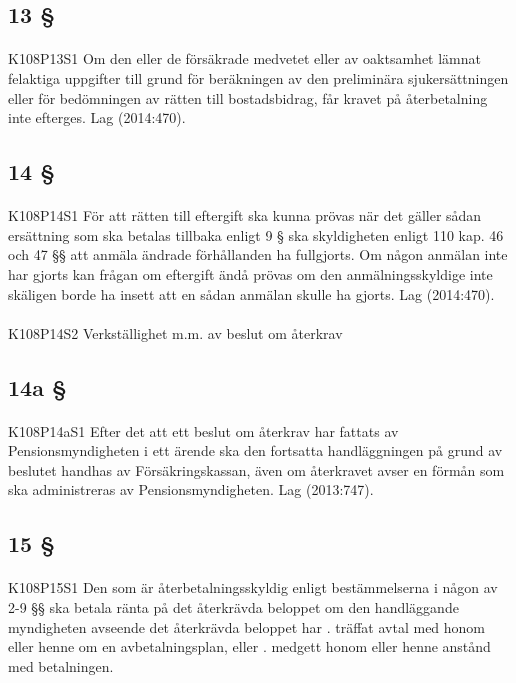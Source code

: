 \documentclass[a4paper,notitlepage,openany,10pt]{book}
\begin{document}
\subsection*{13 §}
\paragraph*{}
{\tiny K108P13S1}
Om den eller de försäkrade medvetet eller av oaktsamhet lämnat felaktiga uppgifter till grund för beräkningen av den preliminära sjukersättningen eller för bedömningen av rätten till bostadsbidrag, får kravet på återbetalning inte efterges.
Lag (2014:470).
\subsection*{14 §}
\paragraph*{}
{\tiny K108P14S1}
För att rätten till eftergift ska kunna prövas när det gäller sådan ersättning som ska betalas tillbaka enligt 9 § ska skyldigheten enligt 110 kap. 46 och 47 §§ att anmäla ändrade förhållanden ha fullgjorts. Om någon anmälan inte har gjorts kan frågan om eftergift ändå prövas om den anmälningsskyldige inte skäligen borde ha insett att en sådan anmälan skulle ha gjorts.
Lag (2014:470).
\paragraph*{}
{\tiny K108P14S2}
Verkställighet m.m. av beslut om återkrav
\subsection*{14a §}
\paragraph*{}
{\tiny K108P14aS1}
Efter det att ett beslut om återkrav har fattats av Pensionsmyndigheten i ett ärende ska den fortsatta handläggningen på grund av beslutet handhas av Försäkringskassan, även om återkravet avser en förmån som ska administreras av Pensionsmyndigheten.
Lag (2013:747).
\subsection*{15 §}
\paragraph*{}
{\tiny K108P15S1}
Den som är återbetalningsskyldig enligt bestämmelserna i någon av 2-9 §§ ska betala ränta på det återkrävda beloppet om den handläggande myndigheten avseende det återkrävda beloppet har
. träffat avtal med honom eller henne om en avbetalningsplan, eller
. medgett honom eller henne anstånd med betalningen.
\end{document}
